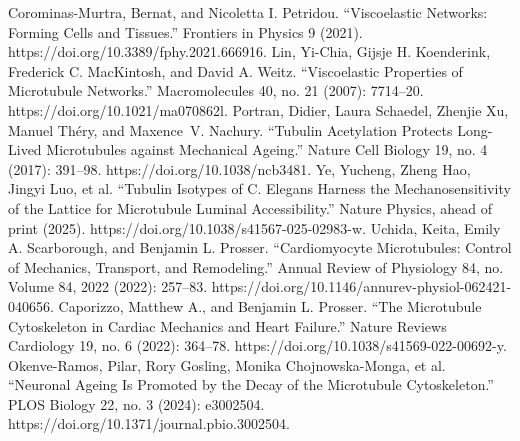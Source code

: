 \documentclass[preprint,12pt,authoryear]{elsarticle}
\begin{document}


\begin{thebibliography}{00}

Corominas-Murtra, Bernat, and Nicoletta I. Petridou. “Viscoelastic Networks: Forming Cells and Tissues.” Frontiers in Physics 9 (2021). https://doi.org/10.3389/fphy.2021.666916.
Lin, Yi-Chia, Gijsje H. Koenderink, Frederick C. MacKintosh, and David A. Weitz. “Viscoelastic Properties of Microtubule Networks.” Macromolecules 40, no. 21 (2007): 7714–20. https://doi.org/10.1021/ma070862l.
Portran, Didier, Laura Schaedel, Zhenjie Xu, Manuel Théry, and Maxence V. Nachury. “Tubulin Acetylation Protects Long-Lived Microtubules against Mechanical Ageing.” Nature Cell Biology 19, no. 4 (2017): 391–98. https://doi.org/10.1038/ncb3481.
Ye, Yucheng, Zheng Hao, Jingyi Luo, et al. “Tubulin Isotypes of C. Elegans Harness the Mechanosensitivity of the Lattice for Microtubule Luminal Accessibility.” Nature Physics, ahead of print (2025). https://doi.org/10.1038/s41567-025-02983-w.
Uchida, Keita, Emily A. Scarborough, and Benjamin L. Prosser. “Cardiomyocyte Microtubules: Control of Mechanics, Transport, and Remodeling.” Annual Review of Physiology 84, no. Volume 84, 2022 (2022): 257–83. https://doi.org/10.1146/annurev-physiol-062421-040656.
Caporizzo, Matthew A., and Benjamin L. Prosser. “The Microtubule Cytoskeleton in Cardiac Mechanics and Heart Failure.” Nature Reviews Cardiology 19, no. 6 (2022): 364–78. https://doi.org/10.1038/s41569-022-00692-y.
Okenve-Ramos, Pilar, Rory Gosling, Monika Chojnowska-Monga, et al. “Neuronal Ageing Is Promoted by the Decay of the Microtubule Cytoskeleton.” PLOS Biology 22, no. 3 (2024): e3002504. https://doi.org/10.1371/journal.pbio.3002504.

 
% 
\end{thebibliography}


\end{document}

